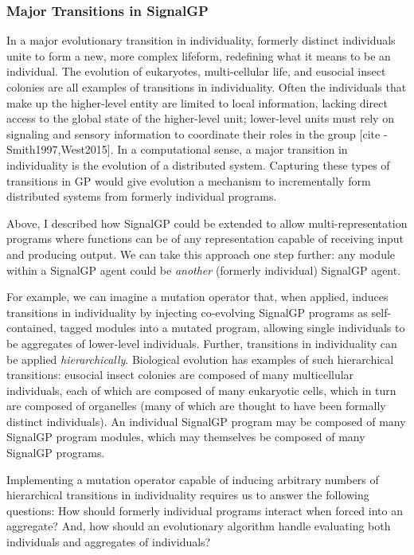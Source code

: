 
\subsubsection{Major Transitions in SignalGP}

In a major evolutionary transition in individuality, formerly distinct individuals unite to form a new, more complex lifeform, redefining what it means to be an individual. 
The evolution of eukaryotes, multi-cellular life, and eusocial insect colonies are all examples of transitions in individuality. 
Often the individuals that make up the higher-level entity are limited to local information, lacking direct access to the global state of the higher-level unit; lower-level units must rely on signaling and sensory information to coordinate their roles in the group [cite - Smith1997,West2015].
In a computational sense, a major transition in individuality is the evolution of a distributed system.
Capturing these types of transitions in GP would give evolution a mechanism to incrementally form distributed systems from formerly individual programs. 

Above, I described how SignalGP could be extended to allow multi-representation programs where functions can be of any representation capable of receiving input and producing output. 
We can take this approach one step further: any module within a SignalGP agent could be \textit{another} (formerly individual) SignalGP agent. 

For example, we can imagine a mutation operator that, when applied, induces transitions in individuality by injecting co-evolving SignalGP programs as self-contained, tagged modules into a mutated program, allowing single individuals to be aggregates of lower-level individuals. 
Further, transitions in individuality can be applied \textit{hierarchically}. 
Biological evolution has examples of such hierarchical transitions: eusocial insect colonies are composed of many multicellular individuals, each of which are composed of many eukaryotic cells, which in turn are composed of organelles (many of which are thought to have been formally distinct individuals).
An individual SignalGP program may be composed of many SignalGP program modules, which may themselves be composed of many SignalGP programs. 

Implementing a mutation operator capable of inducing arbitrary numbers of hierarchical transitions in individuality requires us to answer the following questions: 
How should formerly individual programs interact when forced into an aggregate? 
And, how should an evolutionary algorithm handle evaluating both individuals and aggregates of individuals? 

